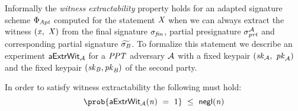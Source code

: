 \begin{definition}
    Informally the \textit{witness extractability} property holds for an adapted signature scheme $\Phi_{\mathit{Apt}}$ computed for the statement $\mathit{X}$ when we can always extract the witness
    $(\mathit{x} ,~ \mathit{X})$ from the final signature $\sigma_{\mathit{fin}}$, partial presignature $\sigma_{\mathit{prt}}^{\mathcal{A}}$ and corresponding partial signature $\widetilde{\sigma_{\mathit{B}}}$.
    To formalize this statement we describe an experiment $\mathsf{aExtrWit_{\mathcal{A}}}$ for a $\mathit{PPT}$ adversary $\mathcal{A}$ with a fixed keypair $(\mathit{sk}_{\mathcal{A}} ,~ \mathit{pk}_{\mathcal{A}})$
    and the fixed keypair $(\mathit{sk}_{\mathit{B}}, \mathit{pk}_{\mathit{B}})$ of the second party.

    \begin{center}
        \fbox{
        \begin{varwidth}{\textwidth}
            \procedure[linenumbering]{$\procExpExt{\varN}$} {
            \varSet \opAssign \cnstEmptySet \\
            (\varNonceAdv \opSeperate \varRandAdv) \opFunResult \procSetupPartSig{\varSecParam} \\
            (\varMsg \opSeperate \varStatement) \opFunResult \cnstAdversary^{\procNonceOracle{\cdot},\procSignPtOracle{\cdot}{\varPubKeyAdv}{\varRandAdv}}(\varPubKeyAdv \opSeperate \varRandAdv) \\
            \varSigPartAdv \opFunResult \procGenPtAptSig{\varMsg}{\varSecKeyAdv}{\varNonceAdv}{\varPubKeyBob}{\varRandBob}{\varWit} \\
            (\varSigBob) \opFunResult \cnstAdversary^{\procNonceOracle{\cdot},\procSignPtOracle{\cdot}{\varPubKeyAdv}{\varRandAdv}}(\varPubKeyAdv \opSeperate \varRandAdv \opSeperate \varSigPartAdv) \\
            \varSigFin \opFunResult \procFinAptSig{\varSigPartAdv}{\varSigBob}{\varRandAdv}{\varRandBob}{\varWit} \\
            \funStar{\varWit} \opFunResult \procExtWit{\varSigFin}{\varSigBob}{\varSigPartAdv} \\
            \pcreturn (\varMsg \opNotIn \varSet \opAnd (\varStatement \opSeperate \funStar{\varWit}) \opNotIn \cnstRelation \opAnd \procVerf{\varMsg}{\varSigFin}{\varPubKeyAdv \opAddPoint \varPubKeyBob})
            }\\

            \procedure[linenumbering]{$\procNonceOracle{\varSecParam}$} {
            (\varNonceBob \opSeperate \varRandBob) \opFunResult \procSetupPartSig{\varSecParam} \\
            \pcreturn \varRandBob
            }
            \procedure[linenumbering]{$\procSignPtOracle{\varMsg}{\varPubKeyAdv}{\varRandAdv}$} {
            \varSet \opAssign \varSet \opUnion \varMsg \\
            \pcreturn \procGenPartSig{\varMsg}{\varSecKeyBob}{\varNonceBob}{\varPubKeyAdv}{\varRandAdv}
            }
        \end{varwidth}
        }
    \end{center}
    In order to satisfy witness extractability the following must hold:
    \[ \prob{\procExpExt{\varN} \opEq 1} \opSmEq \funNegl{\varN} \]
\end{definition}

